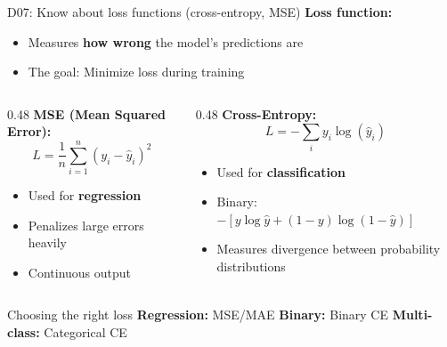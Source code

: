 \documentclass[aspectratio=169, 10pt]{beamer}
\begin{document}
\begin{frame}{D07: Know about loss functions (cross-entropy, MSE)}
    \textbf{Loss function:}
    \begin{itemize}
        \item Measures \textbf{how wrong} the model's predictions are
        \item The goal: Minimize loss during training
    \end{itemize}
    
    \vspace{0.3cm}
    \begin{columns}[T]
        \begin{column}{0.48\textwidth}
            \textbf{MSE (Mean Squared Error):}
            \[
            L = \frac{1}{n}\sum_{i=1}^{n}(y_i - \hat{y}_i)^2
            \]
            \begin{itemize}
                \item Used for \textbf{regression}
                \item Penalizes large errors heavily
                \item Continuous output
            \end{itemize}
        \end{column}
        \begin{column}{0.48\textwidth}
            \textbf{Cross-Entropy:}
            \[
            L = -\sum_{i} y_i \log(\hat{y}_i)
            \]
            \begin{itemize}
                \item Used for \textbf{classification}
                \item Binary: $-[y\log\hat{y} + (1-y)\log(1-\hat{y})]$
                \item Measures divergence between probability distributions
            \end{itemize}
        \end{column}
    \end{columns}
    
    \vspace{0.2cm}
    \begin{block}{\footnotesize Choosing the right loss}
        \footnotesize
        \textbf{Regression:} MSE/MAE \quad \textbf{Binary:} Binary CE \quad \textbf{Multi-class:} Categorical CE
    \end{block}
\end{frame}

\end{document}

